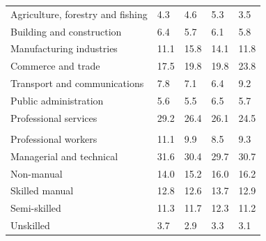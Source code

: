 \documentclass{article}
\begin{document}
\begin{table}[h]
\begin{tabular}{KTTTT}
    \hline
Agriculture, forestry and fishing  & 4.3& 4.6& 5.3& 3.5\\
Building and construction & 6.4& 5.7& 6.1& 5.8\\
Manufacturing industries & 11.1& 15.8& 14.1& 11.8\\
Commerce and trade  & 17.5& 19.8& 19.8& 23.8\\
Transport and communications  & 7.8& 7.1& 6.4& 9.2\\
Public administration & 5.6& 5.5& 6.5& 5.7\\
Professional services & 29.2& 26.4& 26.1& 24.5\\
\hline
    \\ 
    \hline
Professional workers  & 11.1&  9.9 &  8.5&  9.3\\
Managerial and technical & 31.6& 30.4& 29.7& 30.7\\
Non-manual & 14.0& 15.2& 16.0& 16.2\\
Skilled manual & 12.8& 12.6& 13.7& 12.9\\
Semi-skilled & 11.3& 11.7& 12.3& 11.2\\
Unskilled  & 3.7& 2.9& 3.3& 3.1\\
\end{tabular}
\end{table}
\pagebreak
\end{document}
